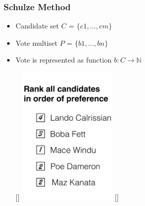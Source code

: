\documentclass{beamer}
\begin{document}
\begin{frame}
\frametitle{Schulze Method}

\begin{itemize}
\item Candidate set $C$ = $\{c1,\dots,cm\}$
 \item Vote multiset  $P$ = $\{b1,\dots,bn\}$
 \item Vote is represented as function $b: C \rightarrow \mathbb{N}$

   \begin{center}
   
  
    \raisebox{0pt}[\dimexpr{}\baselineskip\relax]
    {\includegraphics[width=0.37\textwidth]{bal-cropped.pdf}}
    \raisebox{0pt}[\dimexpr{}\baselineskip\relax]{}
     \end{center}
 \end{itemize}
 \end{frame}


%
%
%
%
\end{document}

